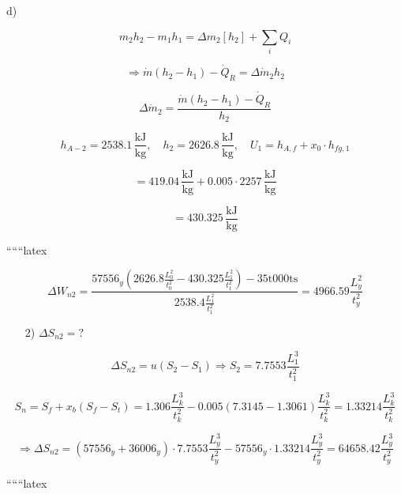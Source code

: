 d)

\[
m_2 h_2 - m_1 h_1 = \Delta m_2 [h_2] + \sum_i Q_i
\]

\[
\Rightarrow \dot{m} (h_2 - h_1) - \dot{Q}_R = \Delta \dot{m}_2 h_2
\]

\[
\Delta \dot{m}_2 = \frac{\dot{m} (h_2 - h_1) - \dot{Q}_R}{h_2}
\]

\[
h_{A-2} = 2538.1 \, \frac{\text{kJ}}{\text{kg}}, \quad h_2 = 2626.8 \, \frac{\text{kJ}}{\text{kg}}, \quad U_1 = h_{A,f} + x_0 \cdot h_{fg,1}
\]

\[
= 419.04 \, \frac{\text{kJ}}{\text{kg}} + 0.005 \cdot 2257 \, \frac{\text{kJ}}{\text{kg}}
\]

\[
= 430.325 \, \frac{\text{kJ}}{\text{kg}}
\]

``````latex


\[
\Delta W_{n2} = \frac{57556_y \left( 2626.8 \frac{L^2_0}{t^2_0} - 430.325 \frac{L^2_1}{t^2_1} \right) - 35 \text{t000ts}}{2538.4 \frac{L^2_1}{t^2_1}} = 4966.59 \frac{L^2_y}{t^2_y}
\]

\begin{itemize}
    \item[2)] $\Delta S_{n2} = ?$
\end{itemize}

\[
\Delta S_{n2} = u(S_2 - S_1) \Rightarrow S_2 = 7.7553 \frac{L^3_1}{t^2_1}
\]

\[
S_n = S_f + x_b (S_f - S_t) = 1.306 \frac{L^3_k}{t^2_k} - 0.005 \left( 7.3145 - 1.3061 \right) \frac{L^3_k}{t^2_k} = 1.33214 \frac{L^3_k}{t^2_k}
\]

\[
\Rightarrow \Delta S_{n2} = \left( 57556_y + 36006_y \right) \cdot 7.7553 \frac{L^3_y}{t^2_y} - 57556_y \cdot 1.33214 \frac{L^3_y}{t^2_y} = 64658.42 \frac{L^3_y}{t^2_y}
\]

``````latex